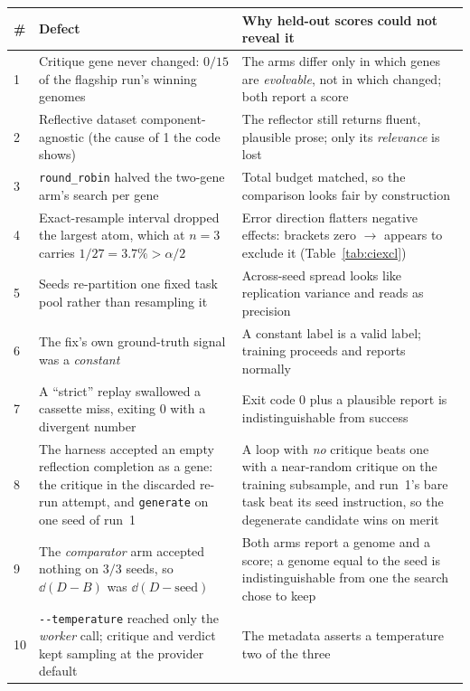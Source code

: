 \documentclass[11pt]{article}
\begin{document}
\begin{table}[h]
\centering
\small
\begin{tabular}{p{}p{}p{}}
\toprule
\# & Defect & Why held-out scores could not reveal it \\
\midrule
1 & Critique gene never changed: $0/15$ of the flagship run's winning genomes & The arms differ only in which genes
  are \emph{evolvable}, not in which changed; both report a score \\
2 & Reflective dataset component-agnostic (the cause of 1 the code shows) & The reflector still returns
  fluent, plausible prose; only its \emph{relevance} is lost \\
3 & \texttt{round\_robin} halved the two-gene arm's search per gene & Total budget matched, so
  the comparison looks fair by construction \\
4 & Exact-resample interval dropped the largest atom, which at $n{=}3$ carries
  $1/27 = 3.7\% > \alpha/2$ & Error direction flatters negative effects: brackets zero
  $\to$ appears to exclude it (Table~\ref{tab:ciexcl}) \\
5 & Seeds re-partition one fixed task pool rather than resampling it & Across-seed spread
  looks like replication variance and reads as precision \\
6 & The fix's own ground-truth signal was a \emph{constant} & A constant label is a valid
  label; training proceeds and reports normally \\
7 & A ``strict'' replay swallowed a cassette miss, exiting $0$ with a divergent number &
  Exit code $0$ plus a plausible report is indistinguishable from success \\
8 & The harness accepted an empty reflection completion as a gene: the critique in the discarded
  re-run attempt, and \texttt{generate} on one seed of run~1 & A loop with \emph{no}
  critique beats one with a near-random critique on the training subsample, and run~1's bare task
  beat its seed instruction, so the degenerate candidate wins on merit \\
9 & The \emph{comparator} arm accepted nothing on $3/3$ seeds, so $\dd(D-B)$ was
  $\dd(D-\mathrm{seed})$ & Both arms report a genome and a score; a genome equal to the seed is
  indistinguishable from one the search chose to keep \\
10 & \texttt{-{}-temperature} reached only the \emph{worker} call; critique and verdict kept
  sampling at the provider default & The metadata asserts a temperature two of the three

\end{tabular}
\end{table}
\end{document}

